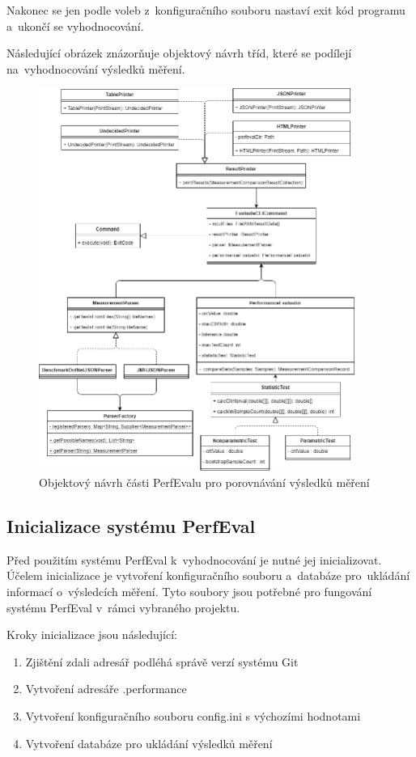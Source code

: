 Nakonec se jen podle voleb z~konfiguračního souboru nastaví exit kód programu a~ukončí se vyhodnocování.

Následující obrázek znázorňuje objektový návrh tříd, které se podílejí na~vyhodnocování výsledků měření.

\begin{figure}[!ht]
    \centering
    \includegraphics[width=0.92\textwidth]{../img/perfeval_evaluate.png}
    \caption{Objektový návrh části PerfEvalu pro porovnávání výsledků měření}
\end{figure}

\subsection{Inicializace systému PerfEval}

Před použitím systému PerfEval k~vyhodnocování je nutné jej inicializovat.
Účelem inicializace je vytvoření konfiguračního souboru a~databáze pro~ukládání informací o~výsledcích měření.
Tyto soubory jsou potřebné pro fungování systému PerfEval v~rámci vybraného projektu.

Kroky inicializace jsou následující:
\begin{enumerate}
    \item Zjištění zdali adresář podléhá správě verzí systému Git
    \item Vytvoření adresáře .performance
    \item Vytvoření konfiguračního souboru config.ini s výchozími hodnotami
    \item Vytvoření databáze pro ukládání výsledků měření
\end{enumerate}

